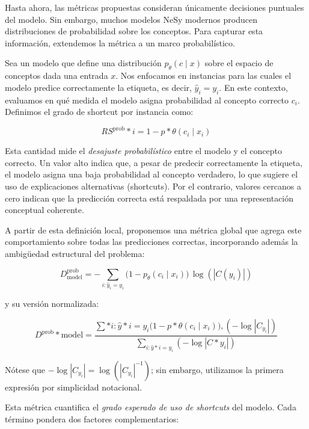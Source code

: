 \documentclass[12pt]{article}
\begin{document}
Hasta ahora, las métricas propuestas consideran únicamente decisiones puntuales del modelo. Sin embargo, muchos modelos NeSy modernos producen distribuciones de probabilidad sobre los conceptos. Para capturar esta información, extendemos la métrica a un marco probabilístico.

Sea un modelo que define una distribución $p_\theta(c \mid x)$ sobre el espacio de conceptos dada una entrada $x$. Nos enfocamos en instancias para las cuales el modelo predice correctamente la etiqueta, es decir, $\hat{y}_i = y_i$. En este contexto, evaluamos en qué medida el modelo asigna probabilidad al concepto correcto $c_i$. Definimos el grado de shortcut por instancia como:

\begin{equation}
RS^{\text{prob}}*i = 1 - p*\theta(c_i \mid x_i)
\end{equation}

Esta cantidad mide el \textit{desajuste probabilístico} entre el modelo y el concepto correcto. Un valor alto indica que, a pesar de predecir correctamente la etiqueta, el modelo asigna una baja probabilidad al concepto verdadero, lo que sugiere el uso de explicaciones alternativas (shortcuts). Por el contrario, valores cercanos a cero indican que la predicción correcta está respaldada por una representación conceptual coherente.

A partir de esta definición local, proponemos una métrica global que agrega este comportamiento sobre todas las predicciones correctas, incorporando además la ambigüedad estructural del problema:

\begin{equation}
D^{\text{prob}}_{\text{model}} =
- \sum_{i: \hat{y}_i = y_i}
\big(1 - p_\theta(c_i \mid x_i)\big)\,\log (|C(y_i)|)
\end{equation}

y su versión normalizada:

\begin{equation}
D^{\text{prob}}*{\text{model}} =
\frac{
\sum*{i: \hat{y}*i = y_i}
\big(1 - p*\theta(c_i \mid x_i)\big), (-\log |C_{y_i}|)
}{
\sum_{i: \hat{y}*i = y_i}
(-\log |C*{y_i}|)
}
\end{equation}

Nótese que $-\log |C_{y_i}| = \log (|C_{y_i}|^{-1})$; sin embargo, utilizamos la primera expresión por simplicidad notacional.

Esta métrica cuantifica el \textit{grado esperado de uso de shortcuts} del modelo. Cada término pondera dos factores complementarios:
\end{document}
